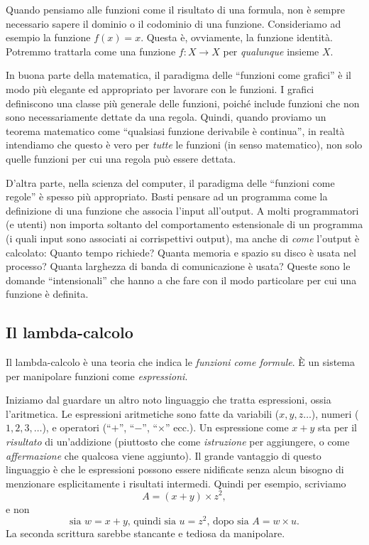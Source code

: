 \documentclass{article}
\begin{document}
Quando pensiamo alle funzioni come il risultato di una formula, non
\`e sempre necessario sapere il dominio o il codominio di una funzione. Consideriamo
ad esempio la funzione $f(x)=x$. Questa \`e, ovviamente, la funzione
identit\`a. Potremmo trattarla come una funzione $f:X\to X$ per {\em qualunque} insieme $X$.

In buona parte della matematica, il paradigma delle 
``funzioni come grafici'' \`e il modo pi\`u elegante ed appropriato per lavorare con le funzioni. 
I grafici definiscono una classe pi\`u generale delle funzioni, poich\'e include
funzioni che non sono necessariamente dettate da una regola. Quindi, quando
proviamo un teorema matematico come ``qualsiasi funzione derivabile
\`e continua'', in realt\`a intendiamo che questo \`e vero per {\em tutte} le funzioni
(in senso matematico), non solo quelle funzioni per cui una regola pu\`o essere dettata.

D'altra parte, nella scienza del computer, il paradigma delle
``funzioni come regole'' \`e spesso pi\`u appropriato. Basti pensare ad un programma 
come la definizione di una funzione che associa l'input all'output. A molti programmatori
(e utenti) non importa soltanto del comportamento estensionale di 
un programma (i quali input sono associati ai corrispettivi output),
ma  anche di {\em come} l'output \`e calcolato: Quanto tempo richiede?
Quanta memoria e spazio su disco \`e usata nel processo? Quanta larghezza di 
banda di comunicazione \`e usata? Queste sono le domande ``intensionali'' che 
hanno a che fare con il modo particolare
per cui una funzione \`e definita.

\subsection{Il lambda-calcolo}

Il lambda-calcolo \`e una teoria che indica le {\em funzioni come formule}. \`E un
sistema per manipolare funzioni come {\em espressioni}.

Iniziamo dal guardare un altro noto linguaggio che tratta espressioni, ossia l'aritmetica. 
Le espressioni aritmetiche sono fatte da variabili ($x,y,z\ldots$), 
numeri ($1,2,3,\ldots$), e operatori (``$+$'', ``$-$'', ``$\times$'' ecc.). 
Un espressione come $x+y$ sta per il {\em risultato} di un'addizione
(piuttosto che come {\em istruzione} per aggiungere, o come {\em affermazione} 
che qualcosa viene aggiunto). Il grande vantaggio di questo linguaggio 
\`e che le espressioni possono essere nidificate senza alcun bisogno 
di menzionare esplicitamente i risultati intermedi. Quindi
per esempio, scriviamo
\[   A = (x+y)\times z^2,   
\]
e non 
\[   \mbox{sia $w=x+y$, quindi sia $u=z^2$, dopo sia $A=w\times u$.}    
\]
La seconda scrittura sarebbe stancante e tediosa da manipolare.
\end{document}

